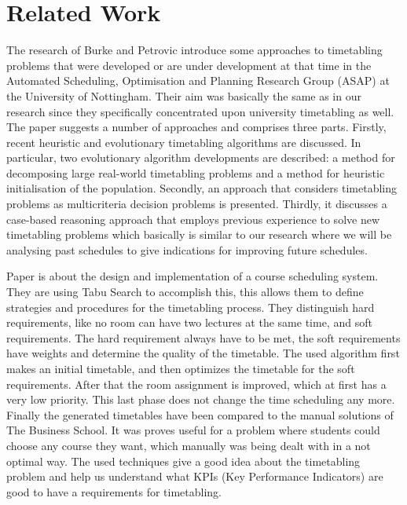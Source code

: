\section{Related Work}
The research of Burke and Petrovic \cite{recentResearchDirectionsInAutomatedTimetabling} introduce some approaches to timetabling problems that were developed or are under development at that time in the Automated Scheduling, Optimisation and Planning Research Group
(ASAP) at the University of Nottingham. Their aim was basically the same as in our research since they specifically concentrated upon university timetabling as well. The paper suggests a number of approaches and comprises three parts. Firstly, recent
heuristic and evolutionary timetabling algorithms are discussed. In particular, two evolutionary algorithm developments
are described: a method for decomposing large real-world timetabling problems and a method for heuristic
initialisation of the population. Secondly, an approach that considers timetabling problems as multicriteria decision
problems is presented. Thirdly, it discusses a case-based reasoning approach that employs previous experience to solve
new timetabling problems which basically is similar to our research where we will be analysing past schedules to give indications for improving future schedules. 

Paper \cite{designAndImplementationOfACourseSchedulingSystem} is about the design and implementation of a course scheduling system. They are using Tabu Search to accomplish this, this allows them to define strategies and procedures for the timetabling process. 
They distinguish hard requirements, like no room can have two lectures at the same time, and soft requirements. The hard requirement always have to be met, the soft requirements have weights and determine the quality of the timetable. The used algorithm first makes an initial timetable, and then optimizes the timetable for the soft requirements. After that the room assignment is improved, which at first has a very low priority. This last phase does not change the time scheduling any more.
Finally the generated timetables have been compared to the manual solutions of The Business School. It was proves useful for a problem where students could choose any course they want, which manually was being dealt with in a not optimal way.
The used techniques give a good idea about the timetabling problem and help us understand what KPIs (Key Performance Indicators) are good to have a requirements for timetabling.
